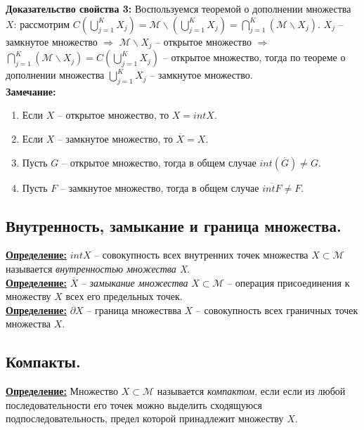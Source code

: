 \documentclass[a4paper,12pt]{article} %
\begin{document}
	\textbf{Доказательство свойства 3:} Воспользуемся теоремой о дополнении множества $X$: рассмотрим $C(\bigcup \limits_{j = 1}^K X_j) = \mathscr{M} \backslash (\bigcup \limits_{j = 1}^K X_j) = \bigcap \limits_{j=1}^K (\mathscr{M} \backslash X_j)$. $X_j$ -- замкнутое множество $\Rightarrow$ $\mathscr{M} \backslash X_j$ -- открытое множество $\Rightarrow$ $\bigcap \limits_{j=1}^K (\mathscr{M} \backslash X_j) = C(\bigcup \limits_{j = 1}^K X_j)$ -- открытое множество, тогда по теореме о дополнении множества $\bigcup \limits_{j = 1}^K X_j$ -- замкнутое множество.\\
	
	\textbf{Замечание:}
	
	\begin{enumerate}
		\item Если $X$ -- открытое множество, то $X = int X$.
		\item Если $X$ -- замкнутое множество, то $\overline{X} = X$.
		\item Пусть $G$ -- открытое множество, тогда в общем случае $int(\overline{G}) \neq G$.
		\item Пусть $F$ -- замкнутое множество, тогда в общем случае $\overline{int F} \neq F$.\\
	\end{enumerate}
	
	\subsection{Внутренность, замыкание и граница множества.}
	
	\underline{\textbf{Определение:}} $int X$ -- совокупность всех внутренних точек множества $X \subset \mathscr{M}$ называется \textit{внутренностью множества X}.\\
	
	\underline{\textbf{Определение:}} $\overline X$ -- \textit{замыкание множества} $X \subset \mathscr{M}$ -- операция присоединения к множеству $X$ всех его предельных точек.\\
	
	\underline{\textbf{Определение:}} $\partial X$ -- граница множествва $X$ -- совокупность всех граничных точек множества $X$.\\
	
	\subsection{Компакты.}
	
	\underline{\textbf{Определение:}} Множество $X \subset \mathscr{M}$ называется \textit{компактом}, если если из любой последовательности его точек можно выделить сходящуюся подпоследовательность, предел которой принадлежит множеству $X$.
	
\end{document}
